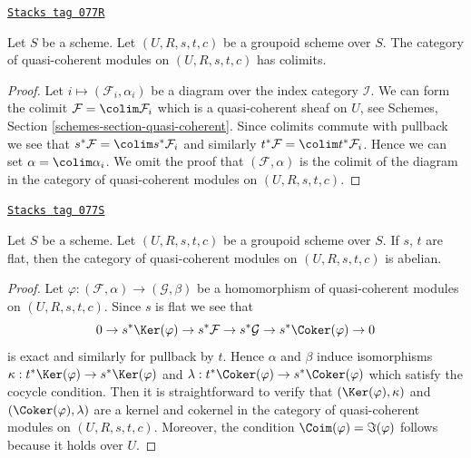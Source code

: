 \begin{lemma}[Colimits]
\label{groupoids-lemma-colimits}
\href{https://stacks.math.columbia.edu/tag/077R}{\texttt{Stacks tag 077R}}

Let $S$ be a scheme. Let $(U, R, s, t, c)$ be a groupoid scheme over $S$.
The category of quasi-coherent modules on $(U, R, s, t, c)$ has colimits.
\end{lemma}

\begin{proof}
Let $i \mapsto (\mathcal{F}_i, \alpha_i)$ be a diagram over the index
category $\mathcal{I}$. We can form the colimit
$\mathcal{F} = \colim \mathcal{F}_i$
which is a quasi-coherent sheaf on $U$, see
Schemes, Section \ref{schemes-section-quasi-coherent}.
Since colimits commute with pullback we see that
$s^*\mathcal{F} = \colim s^*\mathcal{F}_i$ and similarly
$t^*\mathcal{F} = \colim t^*\mathcal{F}_i$. Hence we can set
$\alpha = \colim \alpha_i$. We omit the proof that $(\mathcal{F}, \alpha)$
is the colimit of the diagram in the category of quasi-coherent modules
on $(U, R, s, t, c)$.
\end{proof}

\begin{lemma}[Abelian]
\label{groupoids-lemma-abelian}
\href{https://stacks.math.columbia.edu/tag/077S}{\texttt{Stacks tag 077S}}

Let $S$ be a scheme.
Let $(U, R, s, t, c)$ be a groupoid scheme over $S$.
If $s$, $t$ are flat, then the category of quasi-coherent modules on
$(U, R, s, t, c)$ is abelian.
\end{lemma}

\begin{proof}
Let $\varphi : (\mathcal{F}, \alpha) \to (\mathcal{G}, \beta)$ be a
homomorphism of quasi-coherent modules on $(U, R, s, t, c)$. Since
$s$ is flat we see that
$$
0 \to s^*\Ker(\varphi)
\to s^*\mathcal{F} \to s^*\mathcal{G} \to s^*\Coker(\varphi) \to 0
$$
is exact and similarly for pullback by $t$. Hence $\alpha$ and $\beta$
induce isomorphisms
$\kappa : t^*\Ker(\varphi) \to s^*\Ker(\varphi)$ and
$\lambda : t^*\Coker(\varphi) \to s^*\Coker(\varphi)$
which satisfy the cocycle condition. Then it is straightforward to
verify that $(\Ker(\varphi), \kappa)$ and
$(\Coker(\varphi), \lambda)$ are a kernel and cokernel in the
category of quasi-coherent modules on $(U, R, s, t, c)$. Moreover,
the condition $\Coim(\varphi) = \Im(\varphi)$ follows
because it holds over $U$.
\end{proof}

